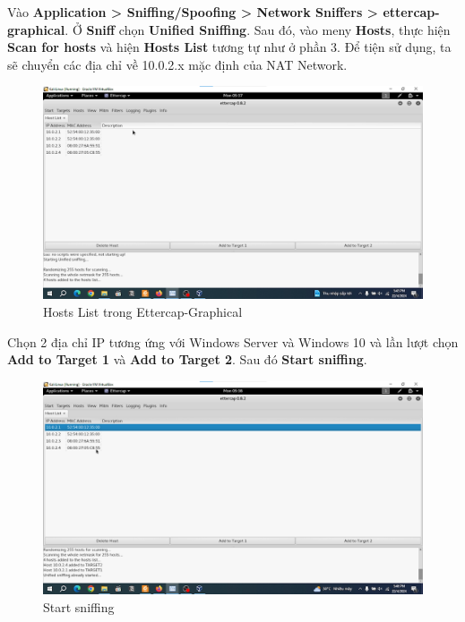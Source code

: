 \newpage

 Vào \textbf{Application > Sniffing/Spoofing > Network Sniffers > ettercap-graphical}. Ở \textbf{Sniff} chọn \textbf{Unified Sniffing}. Sau đó, vào meny \textbf{Hosts}, thực hiện \textbf{Scan for hosts} và hiện \textbf{Hosts List} tương tự như ở phần 3. Để tiện sử dụng, ta sẽ chuyển các địa chỉ về 10.0.2.x mặc định của NAT Network.

\begin{figure}[!htb]
    \centering
    \includegraphics[width=1\linewidth]{figure//chapter5//lab5_4/host_list.png}
    \caption{Hosts List trong Ettercap-Graphical}
    \label{fig:enter-label}
\end{figure}

 Chọn 2 địa chỉ IP tương ứng với Windows Server và Windows 10 và lần lượt chọn \textbf{Add to Target 1} và \textbf{Add to Target 2}. Sau đó \textbf{Start sniffing}.

\begin{figure}[!htb]
    \centering
    \includegraphics[width=0.95\linewidth]{figure//chapter5//lab5_4/start_sniffing.png}
    \caption{Start sniffing}
    \label{fig:enter-label}
\end{figure}

